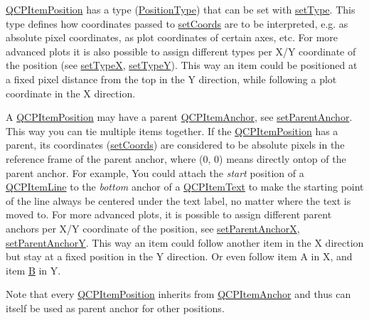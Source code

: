 \hyperlink{class_q_c_p_item_position}{Q\+C\+P\+Item\+Position} has a type (\hyperlink{class_q_c_p_item_position_aad9936c22bf43e3d358552f6e86dbdc8}{Position\+Type}) that can be set with \hyperlink{class_q_c_p_item_position_aa476abf71ed8fa4c537457ebb1a754ad}{set\+Type}. This type defines how coordinates passed to \hyperlink{class_q_c_p_item_position_aa988ba4e87ab684c9021017dcaba945f}{set\+Coords} are to be interpreted, e.\+g. as absolute pixel coordinates, as plot coordinates of certain axes, etc. For more advanced plots it is also possible to assign different types per X/\+Y coordinate of the position (see \hyperlink{class_q_c_p_item_position_a2113b2351d6d00457fb3559a4e20c3ea}{set\+Type\+X}, \hyperlink{class_q_c_p_item_position_ac2a454aa5a54c1615c50686601ec4510}{set\+Type\+Y}). This way an item could be positioned at a fixed pixel distance from the top in the Y direction, while following a plot coordinate in the X direction.

A \hyperlink{class_q_c_p_item_position}{Q\+C\+P\+Item\+Position} may have a parent \hyperlink{class_q_c_p_item_anchor}{Q\+C\+P\+Item\+Anchor}, see \hyperlink{class_q_c_p_item_position_ac094d67a95d2dceafa0d50b9db3a7e51}{set\+Parent\+Anchor}. This way you can tie multiple items together. If the \hyperlink{class_q_c_p_item_position}{Q\+C\+P\+Item\+Position} has a parent, its coordinates (\hyperlink{class_q_c_p_item_position_aa988ba4e87ab684c9021017dcaba945f}{set\+Coords}) are considered to be absolute pixels in the reference frame of the parent anchor, where (0, 0) means directly ontop of the parent anchor. For example, You could attach the {\itshape start} position of a \hyperlink{class_q_c_p_item_line}{Q\+C\+P\+Item\+Line} to the {\itshape bottom} anchor of a \hyperlink{class_q_c_p_item_text}{Q\+C\+P\+Item\+Text} to make the starting point of the line always be centered under the text label, no matter where the text is moved to. For more advanced plots, it is possible to assign different parent anchors per X/\+Y coordinate of the position, see \hyperlink{class_q_c_p_item_position_add71461a973927c74e42179480916d9c}{set\+Parent\+Anchor\+X}, \hyperlink{class_q_c_p_item_position_add5ec1db9d19cec58a3b5c9e0a0c3f9d}{set\+Parent\+Anchor\+Y}. This way an item could follow another item in the X direction but stay at a fixed position in the Y direction. Or even follow item A in X, and item \hyperlink{struct_b}{B} in Y.

Note that every \hyperlink{class_q_c_p_item_position}{Q\+C\+P\+Item\+Position} inherits from \hyperlink{class_q_c_p_item_anchor}{Q\+C\+P\+Item\+Anchor} and thus can itself be used as parent anchor for other positions.

